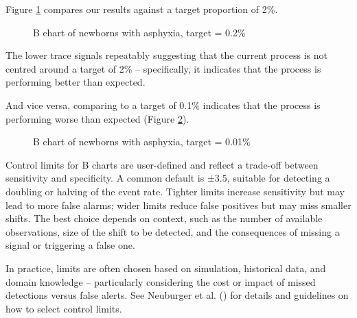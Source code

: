 \documentclass[
]{book}
\makeatletter
\newenvironment{Shaded}{\begin{snugshade}}{\end{snugshade}}
\newcommand{\AttributeTok}[1]{\textcolor[rgb]{0.13,0.29,0.53}{#1}}
\newcommand{\FloatTok}[1]{\textcolor[rgb]{0.00,0.00,0.81}{#1}}
\newcommand{\FunctionTok}[1]{\textcolor[rgb]{0.13,0.29,0.53}{\textbf{#1}}}
\newcommand{\NormalTok}[1]{#1}
\newcommand{\SpecialCharTok}[1]{\textcolor[rgb]{0.81,0.36,0.00}{\textbf{#1}}}
\newcommand*\pandocbounded[1]{%
  \sbox\pandoc@box{#1}%
  \Gscale@div\@tempa{\textheight}{\dimexpr\ht\pandoc@box+\dp\pandoc@box\relax}%
  \Gscale@div\@tempb{\linewidth}{\wd\pandoc@box}%
  \ifdim\@tempb\p@<\@tempa\p@\let\@tempa\@tempb\fi%
  \ifdim\@tempa\p@<\p@\scalebox{\@tempa}{\usebox\pandoc@box}%
  \else\usebox{\pandoc@box}%
  \fi%
}
\makeatother
\begin{document}
Figure \ref{fig:rare-fig8} compares our results against a target proportion of 2\%.

\begin{Shaded}
\end{Shaded}

\begin{figure}
\centering
\pandocbounded{}
\caption{\label{fig:rare-fig8}B chart of newborns with asphyxia, target = 0.2\%}
\end{figure}

The lower trace signals repeatably suggesting that the current process is not centred around a target of 2\% -- specifically, it indicates that the process is performing better than expected.

And vice versa, comparing to a target of 0.1\% indicates that the process is performing worse than expected (Figure \ref{fig:rare-fig9}).

\begin{Shaded}
\end{Shaded}

\begin{figure}
\centering
\pandocbounded{}
\caption{\label{fig:rare-fig9}B chart of newborns with asphyxia, target = 0.01\%}
\end{figure}

Control limits for B charts are user-defined and reflect a trade-off between sensitivity and specificity. A common default is ±3.5, suitable for detecting a doubling or halving of the event rate. Tighter limits increase sensitivity but may lead to more false alarms; wider limits reduce false positives but may miss smaller shifts. The best choice depends on context, such as the number of available observations, size of the shift to be detected, and the consequences of missing a signal or triggering a false one.

In practice, limits are often chosen based on simulation, historical data, and domain knowledge -- particularly considering the cost or impact of missed detections versus false alerts. See Neuburger et al. () for details and guidelines on how to select control limits.
\end{document}
